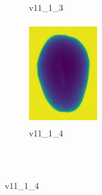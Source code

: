 \documentclass[11pt]{article}
\begin{document}
\begin{figure}
\begin{subfigure}[b]{0.15\textwidth}
        \caption{v11\_1\_3}
         \label{fig:five over x}
     \end{subfigure}
     \hfill
    \begin{subfigure}[b]{0.15\textwidth}
         \centering
         \includegraphics[width=3cm, height=4.5cm]{images/kartofler/v11_1_4_cut.png}
        \caption{v11\_1\_4}
         \label{fig:five over x}
     \end{subfigure}
     
     
        \\ \\
        

\end{figure}
\end{document}
